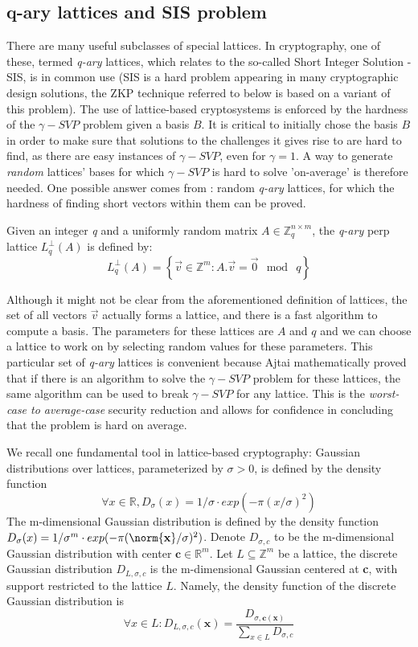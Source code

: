 \subsection{q-ary lattices and SIS problem}
\label{sub:q-ary lattices and SIS problem}
There are many useful subclasses of special lattices. In cryptography,
one of these, termed \emph{q-ary} lattices, which relates to the so-called
Short Integer Solution - SIS, is in common use (SIS is a hard problem appearing in many cryptographic design solutions, the ZKP technique referred to below is based on a variant of this problem). The use of lattice-based cryptosystems is enforced by the hardness of the
$\gamma-SVP$ problem given a basis $B$. It is critical to initially chose the
basis $B$ in order to make sure that solutions to the challenges it gives rise to are hard to find, as there are easy instances of $\gamma-SVP$, even for $\gamma=1$. A way to
generate \emph{random} lattices' bases for which $\gamma-SVP$ is hard to solve
'on-average' is therefore needed. One possible answer comes from \cite{ajtai1996generating}: random
\emph{q-ary} lattices, for which the hardness of finding short
vectors within them can be proved.

\begin{definition}
  Given an integer \emph{q} and a uniformly random matrix
  $A \in \mathbb{Z}_{q}^{n \times m}$, the \emph{q-ary} perp lattice
  $L_q^\bot(A)$ is defined by:
  \[
    L_q^\bot(A) = \left\{ \vec{v} \in \mathbb{Z}^m : A.\vec{v} = \vec{0} \mod \
      q \right\}
  \]
\end{definition}
Although it might not be clear from the aforementioned definition of lattices, the set of all vectors
$\vec{v}$ actually forms a lattice,  and
there is a fast algorithm to compute a basis. The parameters for these
lattices are $A$ and $q$ and we can choose a lattice to work on by selecting random
values for these parameters. This particular set of \emph{q-ary} lattices is convenient
because Ajtai mathematically proved that if there is an algorithm to solve the
$\gamma-SVP$ problem for these lattices, the same algorithm can be used to break
$\gamma-SVP$ for any lattice. This is the \emph{worst-case to average-case}
security reduction and allows for confidence in concluding that the problem is hard on average.

We recall one fundamental tool in lattice-based cryptography: Gaussian distributions over lattices, parameterized by $\sigma > 0$, is defined by the density function
\[
  \forall x \in \mathbb{R}, D_{\sigma}(x) = 1/\sigma \cdot exp(-\pi(x/\sigma)^{2})
\]
The m-dimensional Gaussian distribution is defined by the density function $D_{\sigma}(x) = 1/\sigma^{m} \cdot exp(-\pi(\norm{\mathbf{x}}/\sigma)^{2})$. Denote $D_{\sigma,c}$ to be the m-dimensional Gaussian distribution with center $\mathbf{c} \in \mathbb{R}^{m}$. Let $L \subseteq \mathbb{Z}^{m}$ be a lattice, the discrete Gaussian distribution $D_{L, \sigma, c}$ is the m-dimensional Gaussian centered at \textbf{c}, with support restricted to the lattice $L$. Namely, the density function of the discrete Gaussian distribution is
\[
  \forall x \in L : D_{L,\sigma, c}(\mathbf{x}) = \frac{D_{\sigma, \mathbf{c(x)}}}{\sum_{x \in L}D_{\sigma,c}}
\]

